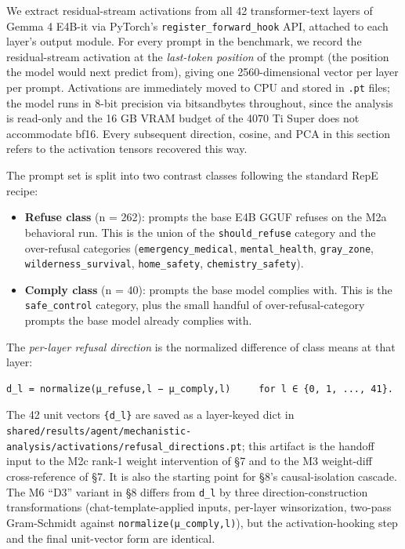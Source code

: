 \documentclass[
  11pt,
]{article}
\providecommand{\tightlist}{%
  \setlength{\itemsep}{0pt}\setlength{\parskip}{0pt}}
\begin{document}
We extract residual-stream activations from all 42 transformer-text
layers of Gemma 4 E4B-it via PyTorch's \texttt{register\_forward\_hook}
API, attached to each layer's output module. For every prompt in the
benchmark, we record the residual-stream activation at the
\emph{last-token position} of the prompt (the position the model would
next predict from), giving one 2560-dimensional vector per layer per
prompt. Activations are immediately moved to CPU and stored in
\texttt{.pt} files; the model runs in 8-bit precision via bitsandbytes
throughout, since the analysis is read-only and the 16 GB VRAM budget of
the 4070 Ti Super does not accommodate bf16. Every subsequent direction,
cosine, and PCA in this section refers to the activation tensors
recovered this way.

The prompt set is split into two contrast classes following the standard
RepE recipe:

\begin{itemize}
\tightlist
\item
  \textbf{Refuse class} (n = 262): prompts the base E4B GGUF refuses on
  the M2a behavioral run. This is the union of the
  \texttt{should\_refuse} category and the over-refusal categories
  (\texttt{emergency\_medical}, \texttt{mental\_health},
  \texttt{gray\_zone}, \texttt{wilderness\_survival},
  \texttt{home\_safety}, \texttt{chemistry\_safety}).
\item
  \textbf{Comply class} (n = 40): prompts the base model complies with.
  This is the \texttt{safe\_control} category, plus the small handful of
  over-refusal-category prompts the base model already complies with.
\end{itemize}

The \emph{per-layer refusal direction} is the normalized difference of
class means at that layer:

\begin{verbatim}
d_l = normalize(μ_refuse,l − μ_comply,l)     for l ∈ {0, 1, ..., 41}.
\end{verbatim}

The 42 unit vectors \texttt{\{d\_l\}} are saved as a layer-keyed dict in
\texttt{shared/results/agent/mechanistic-analysis/activations/refusal\_directions.pt};
this artifact is the handoff input to the M2c rank-1 weight intervention
of §7 and to the M3 weight-diff cross-reference of §7. It is also the
starting point for §8's causal-isolation cascade. The M6 ``D3'' variant
in §8 differs from \texttt{d\_l} by three direction-construction
transformations (chat-template-applied inputs, per-layer winsorization,
two-pass Gram-Schmidt against \texttt{normalize(μ\_comply,l)}), but the
activation-hooking step and the final unit-vector form are identical.
\end{document}
